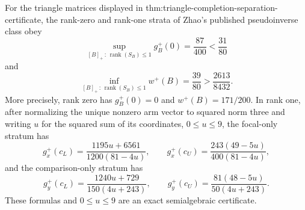For the triangle matrices displayed in thm:triangle-completion-separation-certificate, the rank-zero and rank-one strata of Zhao's published pseudoinverse class obey
\[
\sup_{[B]_+\,:\,\operatorname{rank}(S_B)\le1}g_B^+(0)
=\frac{87}{400}<\frac{31}{80}
\]
and
\[
\inf_{[B]_+\,:\,\operatorname{rank}(S_B)\le1}w^+(B)
=\frac{39}{80}>\frac{2613}{8432}.
\]
More precisely, rank zero has \(g_B^+(0)=0\) and \(w^+(B)=171/200\).  In rank one, after normalizing the unique nonzero arm vector to squared norm three and writing \(u\) for the squared sum of its coordinates, \(0\le u\le9\), the focal-only stratum has
\[
g_x^+(c_L)=\frac{1195u+6561}{1200(81-4u)},
\qquad g_x^+(c_U)=\frac{243(49-5u)}{400(81-4u)},
\]
and the comparison-only stratum has
\[
g_y^+(c_L)=\frac{1240u+729}{150(4u+243)},
\qquad g_y^+(c_U)=\frac{81(48-5u)}{50(4u+243)}.
\]
These formulas and \(0\le u\le9\) are an exact semialgebraic certificate.